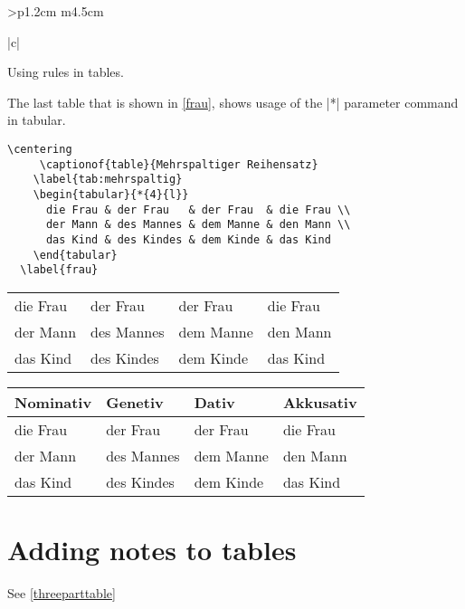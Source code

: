 \begin{tabular}{>{\bfseries}p{1.2cm} m{4.5cm}}
\begin{tabular}[t]{|c|}
\begin{longtable}
\begin{texexample}{Using rules in tables.}{}
\end{texexample}  


The last table that is shown in \ref{frau}, shows usage of the |*| parameter command in tabular.

\begin{scriptexample}{}{}
\begin{verbatim}
\centering
     \captionof{table}{Mehrspaltiger Reihensatz}
    \label{tab:mehrspaltig}
    \begin{tabular}{*{4}{l}}
      die Frau & der Frau   & der Frau  & die Frau \\
      der Mann & des Mannes & dem Manne & den Mann \\
      das Kind & des Kindes & dem Kinde & das Kind
    \end{tabular}
  \label{frau}
\end{verbatim}
{    \centering
    \label{tab:mehrspaltig}
    \begin{tabular}{*{4}{l}}
      die Frau & der Frau   & der Frau  & die Frau \\
      der Mann & des Mannes & dem Manne & den Mann \\
      das Kind & des Kindes & dem Kinde & das Kind
    \end{tabular}
  \label{frau}
  
 }

\end{scriptexample}



{    \centering
    \label{tab:tabellensatz}
    \begin{tabular}{@{}*{4}{l}@{}}
      \toprule
        Nominativ & Genetiv & Dativ & Akkusativ \\
      \midrule
        die Frau & der Frau   & der Frau  & die Frau \\
        der Mann & des Mannes & dem Manne & den Mann \\
        das Kind & des Kindes & dem Kinde & das Kind \\
      \bottomrule
    \end{tabular}
} 

\section{Adding notes to tables}
See \ref{threeparttable}


\end{longtable}
\end{tabular}
\end{tabular}
